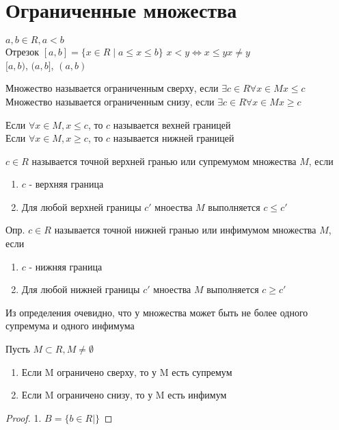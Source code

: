 \section{Ограниченные множества}

$ a, b \in R, a < b $ \\
Отрезок $ [a, b] = \{ x \in R \mid a \leq x \leq b \} $
$ x < y \Leftrightarrow x \leq y x \neq y $ \\
$ [a, b) $,
$ (a, b] $,
$ (a, b) $\\
\begin{definition}
	Множество называется ограниченным сверху, если $ \exists c \in R \forall x \in M x \leq c $ \\
	Множество называется ограниченным снизу, если $ \exists c \in R \forall x \in M x \geq c $ 
\end{definition}

\begin{definition}
	Если $ \forall x \in M, x \leq c$, то $c$ называется вехней границей \\
	Если $ \forall x \in M, x \geq c$, то $c$ называется нижней границей 
\end{definition}
\begin{definition}
	$ c \in R $ называется точной верхней гранью или супремумом множества $M$, если
	\begin{enumerate}
		\item $c$ - верхняя граница
		\item Для любой верхней границы $c'$ мноества $M$ выполняется $ c \leq c'$
	\end{enumerate}
\end{definition}
\begin{definition}
Опр. $ c \in R $ называется точной нижней гранью или инфимумом множества $M$, если 
\begin{enumerate}
	\item $c$ - нижняя граница
	\item Для любой нижней границы $c'$ мноества $M$ выполняется $ c \geq c'$ 
\end{enumerate}
\end{definition}
Из определения очевидно, что у множества может быть не более одного супремума и одного инфимума 
\begin{theorem}
	Пусть $ M \subset R, M \neq \emptyset $ 
	\begin{enumerate}
		\item Если M ограничено сверху, то у M есть супремум
		\item Если M ограничено снизу, то у M есть инфимум

	\end{enumerate}
	\begin{proof}
		1. $ B = \{ b \in R \mid  \} $
	\end{proof}
\end{theorem}

